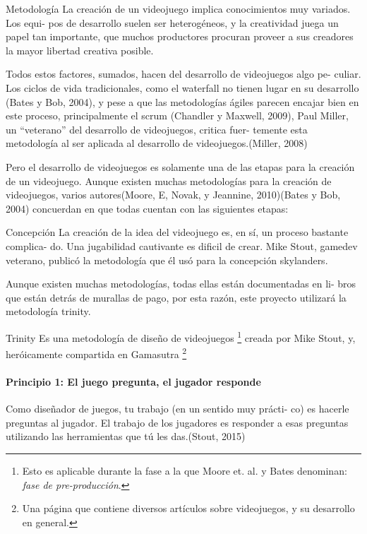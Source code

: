 \begin{section}{Metodología}
  La creación de un videojuego implica conocimientos muy variados. Los equi- pos de desarrollo suelen ser heterogéneos, y la creatividad juega un papel tan importante, que muchos productores procuran proveer a sus creadores la mayor libertad creativa posible.

  Todos estos factores, sumados, hacen del desarrollo de videojuegos algo pe- culiar. Los ciclos de vida tradicionales, como el waterfall no tienen lugar en su desarrollo (Bates y Bob, 2004), y pese a que las metodologías ágiles parecen encajar bien en este proceso, principalmente el scrum (Chandler y Maxwell, 2009), Paul Miller, un ``veterano'' del desarrollo de videojuegos, critica fuer- temente esta metodología al ser aplicada al desarrollo de videojuegos.(Miller, 2008)

  Pero el desarrollo de videojuegos es solamente una de las etapas para la creación de un videojuego. Aunque existen muchas metodologías para la creación de videojuegos, varios autores(Moore, E, Novak, y Jeannine, 2010)(Bates y Bob, 2004) concuerdan en que todas cuentan con las siguientes etapas:
  \begin{subsection}{Concepción}
    La creación de la idea del videojuego es, en sí, un proceso bastante complica- do. Una jugabilidad cautivante es dificil de crear. Mike Stout, gamedev veterano, publicó la metodología que él usó para la concepción skylanders.

    Aunque existen muchas metodologías, todas ellas están documentadas en li- bros que están detrás de murallas de pago, por esta razón, este proyecto utilizará la metodología trinity.

    \begin{subsubsection}{Trinity}
      Es una metodología de diseño de videojuegos \footnote{Esto es aplicable durante la fase a la que Moore et. al. y Bates denominan: \textit{fase de pre-producción}.} creada por Mike Stout, y, heróicamente compartida en Gamasutra \footnote{Una página que contiene diversos artículos sobre videojuegos, y su desarrollo en general.}

      \paragraph{Principio 1: El juego pregunta, el jugador responde}

      \begin{citation}
        Como diseñador de juegos, tu trabajo (en un sentido muy prácti- co) es hacerle preguntas al jugador. El trabajo de los jugadores es responder a esas preguntas utilizando las herramientas que tú les das.(Stout, 2015)
      \end{citation}


\end{subsubsection}
\end{subsection}
\end{section}
